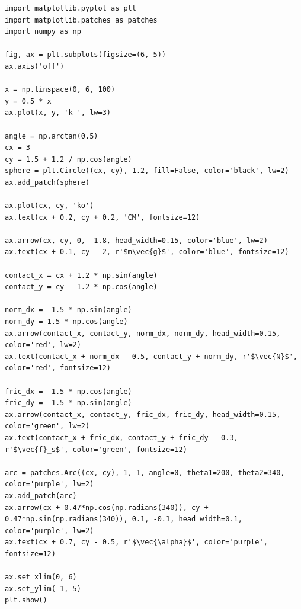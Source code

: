 \documentclass[12pt, a4paper]{article}
\begin{document}
\begin{verbatim}
import matplotlib.pyplot as plt
import matplotlib.patches as patches
import numpy as np

fig, ax = plt.subplots(figsize=(6, 5))
ax.axis('off')

x = np.linspace(0, 6, 100)
y = 0.5 * x
ax.plot(x, y, 'k-', lw=3)

angle = np.arctan(0.5)
cx = 3
cy = 1.5 + 1.2 / np.cos(angle)
sphere = plt.Circle((cx, cy), 1.2, fill=False, color='black', lw=2)
ax.add_patch(sphere)

ax.plot(cx, cy, 'ko')
ax.text(cx + 0.2, cy + 0.2, 'CM', fontsize=12)

ax.arrow(cx, cy, 0, -1.8, head_width=0.15, color='blue', lw=2)
ax.text(cx + 0.1, cy - 2, r'$m\vec{g}$', color='blue', fontsize=12)

contact_x = cx + 1.2 * np.sin(angle)
contact_y = cy - 1.2 * np.cos(angle)

norm_dx = -1.5 * np.sin(angle)
norm_dy = 1.5 * np.cos(angle)
ax.arrow(contact_x, contact_y, norm_dx, norm_dy, head_width=0.15, color='red', lw=2)
ax.text(contact_x + norm_dx - 0.5, contact_y + norm_dy, r'$\vec{N}$', color='red', fontsize=12)

fric_dx = -1.5 * np.cos(angle)
fric_dy = -1.5 * np.sin(angle)
ax.arrow(contact_x, contact_y, fric_dx, fric_dy, head_width=0.15, color='green', lw=2)
ax.text(contact_x + fric_dx, contact_y + fric_dy - 0.3, r'$\vec{f}_s$', color='green', fontsize=12)

arc = patches.Arc((cx, cy), 1, 1, angle=0, theta1=200, theta2=340, color='purple', lw=2)
ax.add_patch(arc)
ax.arrow(cx + 0.47*np.cos(np.radians(340)), cy + 0.47*np.sin(np.radians(340)), 0.1, -0.1, head_width=0.1, color='purple', lw=2)
ax.text(cx + 0.7, cy - 0.5, r'$\vec{\alpha}$', color='purple', fontsize=12)

ax.set_xlim(0, 6)
ax.set_ylim(-1, 5)
plt.show()
\end{verbatim}
\end{document}
